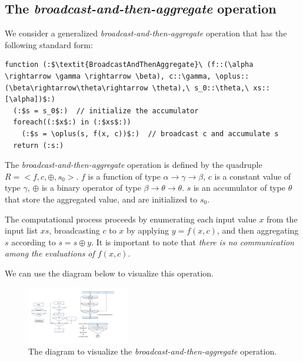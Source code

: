 \subsection{The \textit{broadcast-and-then-aggregate} operation}

We consider a generalized \textit{broadcast-and-then-aggregate} operation that has the following standard form:
\begin{lstlisting}[language=code_example, caption={}]
function (:$\textit{BroadcastAndThenAggregate}\ (f::(\alpha \rightarrow \gamma \rightarrow \beta), c::\gamma, \oplus::(\beta\rightarrow\theta\rightarrow \theta),\ s_0::\theta,\ xs::[\alpha])$:)  
  (:$s = s_0$:)  // initialize the accumulator
  foreach((:$x$:) in (:$xs$:))
    (:$s = \oplus(s, f(x, c))$:)  // broadcast c and accumulate s
  return (:s:)
\end{lstlisting}

The \textit{broadcast-and-then-aggregate} operation is defined by the quadruple $R=<f, c, \oplus, s_0>$.
$f$ is a function of type $\alpha \rightarrow \gamma \rightarrow \beta$, $c$ is a constant value of type $\gamma$,
$\oplus$ is a binary operator of type $\beta \rightarrow \theta \rightarrow \theta$. $s$ is an accumulator of type $\theta$ that store the aggregated value, and are initialized to $s_0$.

The computational process proceeds by enumerating each input value $x$ from the input list $xs$,
broadcasting $c$ to $x$ by applying $y=f(x, c)$, and then aggregating $s$ according to $s = s \oplus y$.
It is important to note that \textit{there is no communication among the evaluations of $f(x,c)$}.

We can use the diagram below to visualize this operation.

\begin{figure}[h]
  \centering
  \includegraphics[width=0.4\textwidth]{figures/map_and_aggregate.pdf}
  \caption{The diagram to visualize the \textit{broadcast-and-then-aggregate} operation.}
\end{figure}


